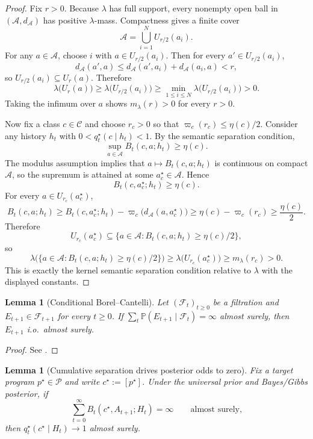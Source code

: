 \documentclass[11pt]{article}
\newtheorem{lemma}[theorem]{Lemma}
\theoremstyle{definition}
\theoremstyle{remark}
\newcommand{\Acal}{\mathcal{A}}
\newcommand{\Ccal}{\mathcal{C}}
\newcommand{\Pcal}{\mathcal{P}}
\newcommand{\Prob}{\mathbb{P}}
\begin{document}
\begin{proof}
Fix $r>0$. Because $\lambda$ has full support, every nonempty open ball in $(\Acal,d_\Acal)$ has positive $\lambda$-mass. Compactness gives a finite cover
\[
\Acal=\bigcup_{i=1}^N U_{r/2}(a_i).
\]
For any $a\in\Acal$, choose $i$ with $a\in U_{r/2}(a_i)$. Then for every $a'\in U_{r/2}(a_i)$,
\[
d_\Acal(a',a)\le d_\Acal(a',a_i)+d_\Acal(a_i,a)<r,
\]
so $U_{r/2}(a_i)\subseteq U_r(a)$. Therefore
\[
\lambda\!\bigl(U_r(a)\bigr)\ge \lambda\!\bigl(U_{r/2}(a_i)\bigr)\ge \min_{1\le i\le N}\lambda\!\bigl(U_{r/2}(a_i)\bigr)>0.
\]
Taking the infimum over $a$ shows $m_\lambda(r)>0$ for every $r>0$.

Now fix a class $c\in\Ccal$ and choose $r_c>0$ so that $\varpi_c(r_c)\le \eta(c)/2$. Consider any history $h_t$ with $0<q_t^\star(c\mid h_t)<1$. By the semantic separation condition,
\[
\sup_{a\in\Acal}B_t(c,a;h_t)\ge \eta(c).
\]
The modulus assumption implies that $a\mapsto B_t(c,a;h_t)$ is continuous on compact $\Acal$, so the supremum is attained at some $a_c^\star\in\Acal$. Hence
\[
B_t(c,a_c^\star;h_t)\ge \eta(c).
\]
For every $a\in U_{r_c}(a_c^\star)$,
\[
B_t(c,a;h_t)\ge B_t(c,a_c^\star;h_t)-\varpi_c\!\bigl(d_\Acal(a,a_c^\star)\bigr)\ge \eta(c)-\varpi_c(r_c)\ge \frac{\eta(c)}{2}.
\]
Therefore
\[
U_{r_c}(a_c^\star)\subseteq \{a\in\Acal:B_t(c,a;h_t)\ge \eta(c)/2\},
\]
so
\[
\lambda\!\bigl(\{a\in\Acal:B_t(c,a;h_t)\ge \eta(c)/2\}\bigr)
\ge
\lambda\!\bigl(U_{r_c}(a_c^\star)\bigr)
\ge
m_\lambda(r_c)>0.
\]
This is exactly the kernel semantic separation condition relative to $\lambda$ with the displayed constants.
\end{proof}

\begin{lemma}[Conditional Borel--Cantelli]
\label{lem:conditional-bc}
Let $(\mathcal{F}_t)_{t\ge 0}$ be a filtration and $E_{t+1}\in\mathcal{F}_{t+1}$ for every $t\ge 0$. If $\sum_t\Prob(E_{t+1}\mid\mathcal{F}_t)=\infty$ almost surely, then $E_{t+1}$ i.o.\ almost surely.
\end{lemma}

\begin{proof}
See \citet[Chapter~12]{Williams1991}.
\end{proof}

\begin{lemma}[Cumulative separation drives posterior odds to zero]
\label{lem:contraction}
Fix a target program $p^\star\in\Pcal$ and write $c^\star:=[p^\star]$. Under the universal prior and Bayes/Gibbs posterior, if
\[
\sum_{t=0}^{\infty}B_t(c^\star,A_{t+1};H_t)=\infty
\qquad
\text{almost surely,}
\]
then $q_t^\star(c^\star\mid H_t)\to 1$ almost surely.
\end{lemma}
\end{document}
